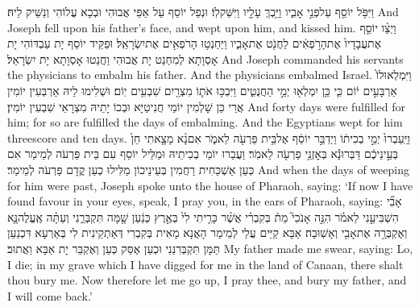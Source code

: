 \newperek
{}%
{וַיִּפֹּ֥ל יוֹסֵ֖ף עַל\maqqaf פְּנֵ֣י אָבִ֑יו וַיֵּ֥בְךְּ עָלָ֖יו וַיִּשַּׁק\maqqaf לֽוֹ׃}
{וּנְפַל יוֹסֵף עַל אַפֵּי אֲבוּהִי וּבְכָא עֲלוֹהִי וְנַשֵּׁיק לֵיהּ׃}
{And Joseph fell upon his father’s face, and wept upon him, and kissed him.}{}
{וַיְצַ֨ו יוֹסֵ֤ף אֶת\maqqaf עֲבָדָיו֙ אֶת\maqqaf הָרֹ֣פְאִ֔ים לַחֲנֹ֖ט אֶת\maqqaf אָבִ֑יו וַיַּחַנְט֥וּ הָרֹפְאִ֖ים אֶת\maqqaf יִשְׂרָאֵֽל׃}
{וּפַקֵּיד יוֹסֵף יָת עַבְדּוֹהִי יָת אָסְוָתָא לְמִחְנַט יָת אֲבוּהִי וַחֲנַטוּ אָסְוָתָא יָת יִשְׂרָאֵל׃}
{And Joseph commanded his servants the physicians to embalm his father. And the physicians embalmed Israel.}{}
{וַיִּמְלְאוּ\maqqaf לוֹ֙ אַרְבָּעִ֣ים י֔וֹם כִּ֛י כֵּ֥ן יִמְלְא֖וּ יְמֵ֣י הַחֲנֻטִ֑ים וַיִּבְכּ֥וּ אֹת֛וֹ מִצְרַ֖יִם שִׁבְעִ֥ים יֽוֹם׃}
{וּשְׁלִימוּ לֵיהּ אַרְבְּעִין יוֹמִין אֲרֵי כֵּן שָׁלְמִין יוֹמֵי חֲנִיטַיָּא וּבְכוֹ יָתֵיהּ מִצְרָאֵי שִׁבְעִין יוֹמִין׃}
{And forty days were fulfilled for him; for so are fulfilled the days of embalming. And the Egyptians wept for him threescore and ten days.}{}
{וַיַּֽעַבְרוּ֙ יְמֵ֣י בְכִית֔וֹ וַיְדַבֵּ֣ר יוֹסֵ֔ף אֶל\maqqaf בֵּ֥ית פַּרְעֹ֖ה לֵאמֹ֑ר אִם\maqqaf נָ֨א מָצָ֤אתִי חֵן֙ בְּעֵ֣ינֵיכֶ֔ם דַּבְּרוּ\maqqaf נָ֕א בְּאׇזְנֵ֥י פַרְעֹ֖ה לֵאמֹֽר׃}
{וַעֲבַרוּ יוֹמֵי בְכִיתֵיהּ וּמַלֵּיל יוֹסֵף עִם בֵּית פַּרְעֹה לְמֵימַר אִם כְּעַן אַשְׁכַּחִית רַחֲמִין בְּעֵינֵיכוֹן מַלִּילוּ כְעַן קֳדָם פַּרְעֹה לְמֵימַר׃}
{And when the days of weeping for him were past, Joseph spoke unto the house of Pharaoh, saying: ‘If now I have found favour in your eyes, speak, I pray you, in the ears of Pharaoh, saying:}{}
{אָבִ֞י הִשְׁבִּיעַ֣נִי לֵאמֹ֗ר הִנֵּ֣ה אָנֹכִי֮ מֵת֒ בְּקִבְרִ֗י אֲשֶׁ֨ר כָּרִ֤יתִי לִי֙ בְּאֶ֣רֶץ כְּנַ֔עַן שָׁ֖מָּה תִּקְבְּרֵ֑נִי וְעַתָּ֗ה אֶֽעֱלֶה\maqqaf נָּ֛א וְאֶקְבְּרָ֥ה אֶת\maqqaf אָבִ֖י וְאָשֽׁוּבָה׃}
{אַבָּא קַיֵּים עֲלַי לְמֵימַר הָאֲנָא מָאִית בְּקִבְרִי דְּאַתְקֵינִית לִי בְּאַרְעָא דִּכְנַעַן תַּמָּן תִּקְבְּרִנַּנִי וּכְעַן אֶסַּק כְּעַן וְאֶקְבַּר יָת אַבָּא וַאֲתוּב׃}
{My father made me swear, saying: Lo, I die; in my grave which I have digged for me in the land of Canaan, there shalt thou bury me. Now therefore let me go up, I pray thee, and bury my father, and I will come back.’}{}
